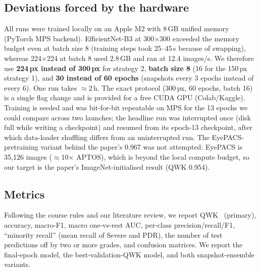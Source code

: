 \subsection{Deviations forced by the hardware}
All runs were trained locally on an Apple M2 with 8\,GB unified memory (PyTorch MPS backend). EfficientNet-B3
at 300$\times$300 exceeded the memory budget even at batch size 8 (training steps took 25--45\,s because of
swapping), whereas 224$\times$224 at batch 8 used 2.8\,GB and ran at 12.4 images/s. We therefore use
\textbf{224\,px instead of 300\,px} for strategy 2, \textbf{batch size 8} (16 for the 150\,px strategy 1), and
\textbf{30 instead of 60 epochs} (snapshots every 3 epochs instead of every 6). One run takes $\approx$2\,h.
The exact protocol (300\,px, 60 epochs, batch 16) is a single flag change and is provided for a free CUDA GPU
(Colab/Kaggle). Training is seeded and was bit-for-bit repeatable on MPS for the 13 epochs we could compare
across two launches; the headline run was interrupted once (disk full while writing a checkpoint) and resumed
from its epoch-13 checkpoint, after which data-loader shuffling differs from an uninterrupted run.
The EyePACS-pretraining variant behind the paper's 0.967 was not attempted: EyePACS is
35{,}126 images ($\approx$10$\times$ APTOS), which is beyond the local compute budget, so our target is the
paper's ImageNet-initialised result (QWK 0.954).

\subsection{Metrics}
Following the course rules and our literature review, we report QWK~\cite{cohen1968kappa} (primary), accuracy,
macro-F1, macro one-vs-rest AUC, per-class precision/recall/F1, ``minority recall'' (mean recall of Severe
and PDR), the number of test predictions off by two or more grades, and confusion matrices. We report the
final-epoch model, the best-validation-QWK model, and both snapshot-ensemble variants.

